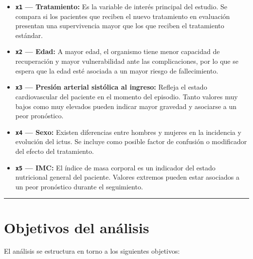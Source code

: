 \documentclass[
]{article}
\begin{document}
\begin{itemize}
\item
  \textbf{\texttt{x1} --- Tratamiento:} Es la variable de interés
  principal del estudio. Se compara si los pacientes que reciben el
  nuevo tratamiento en evaluación presentan una supervivencia mayor que
  los que reciben el tratamiento estándar.
\item
  \textbf{\texttt{x2} --- Edad:} A mayor edad, el organismo tiene menor
  capacidad de recuperación y mayor vulnerabilidad ante las
  complicaciones, por lo que se espera que la edad esté asociada a un
  mayor riesgo de fallecimiento.
\item
  \textbf{\texttt{x3} --- Presión arterial sistólica al ingreso:}
  Refleja el estado cardiovascular del paciente en el momento del
  episodio. Tanto valores muy bajos como muy elevados pueden indicar
  mayor gravedad y asociarse a un peor pronóstico.
\item
  \textbf{\texttt{x4} --- Sexo:} Existen diferencias entre hombres y
  mujeres en la incidencia y evolución del ictus. Se incluye como
  posible factor de confusión o modificador del efecto del tratamiento.
\item
  \textbf{\texttt{x5} --- IMC:} El índice de masa corporal es un
  indicador del estado nutricional general del paciente. Valores
  extremos pueden estar asociados a un peor pronóstico durante el
  seguimiento.
\end{itemize}

\begin{center}\rule{0.5\linewidth}{0.5pt}\end{center}

\hypertarget{objetivos-del-anuxe1lisis}{%
\section{Objetivos del análisis}\label{objetivos-del-anuxe1lisis}}

El análisis se estructura en torno a los siguientes objetivos:
\end{document}
